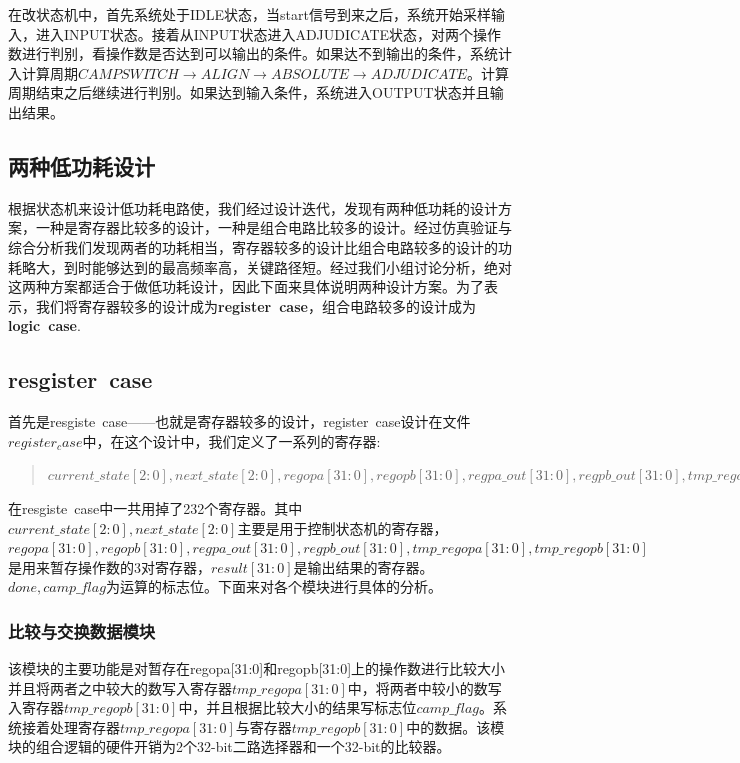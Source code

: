 \documentclass[12pt]{article}
\begin{document}
在改状态机中，首先系统处于IDLE状态，当start信号到来之后，系统开始采样输入，进入INPUT状态。接着从INPUT状态进入ADJUDICATE状态，对两个操作数进行判别，看操作数是否达到可以输出的条件。如果达不到输出的条件，系统计入计算周期$CAMPSWITCH \to ALIGN \to ABSOLUTE \to ADJUDICATE$。计算周期结束之后继续进行判别。如果达到输入条件，系统进入OUTPUT状态并且输出结果。

\subsection{两种低功耗设计}
根据状态机来设计低功耗电路使，我们经过设计迭代，发现有两种低功耗的设计方案，一种是寄存器比较多的设计，一种是组合电路比较多的设计。经过仿真验证与综合分析我们发现两者的功耗相当，寄存器较多的设计比组合电路较多的设计的功耗略大，到时能够达到的最高频率高，关键路径短。经过我们小组讨论分析，绝对这两种方案都适合于做低功耗设计，因此下面来具体说明两种设计方案。为了表示，我们将寄存器较多的设计成为\textbf{register~case}，组合电路较多的设计成为\textbf{logic~case}.

\subsection{resgister~case}
首先是resgiste~case——也就是寄存器较多的设计，register~case设计在文件$register_case$中，在这个设计中，我们定义了一系列的寄存器:

\begin{quote}
$current\_state[2:0],next\_state[2:0]
,regopa[31:0],regopb[31:0],
regpa\_out[31:0],
regpb\_out[31:0],tmp\_regopa[31:0],
tmp\_regopb[31:0],
result[31:0],
done,camp\_flag$
\end{quote}

在resgiste~case中一共用掉了232个寄存器。其中$current\_state[2:0],next\_state[2:0]$主要是用于控制状态机的寄存器，$regopa[31:0],regopb[31:0],regpa\_out[31:0],regpb\_out[31:0],tmp\_regopa[31:0],tmp\_regopb[31:0]$是用来暂存操作数的3对寄存器，$result[31:0]$是输出结果的寄存器。$done,camp\_flag$为运算的标志位。下面来对各个模块进行具体的分析。

\subsubsection{比较与交换数据模块}
该模块的主要功能是对暂存在regopa[31:0]和regopb[31:0]上的操作数进行比较大小并且将两者之中较大的数写入寄存器$tmp\_regopa[31:0]$中，将两者中较小的数写入寄存器$tmp\_regopb[31:0]$中，并且根据比较大小的结果写标志位$camp\_flag$。系统接着处理寄存器$tmp\_regopa[31:0]$与寄存器$tmp\_regopb[31:0]$中的数据。该模块的组合逻辑的硬件开销为2个32-bit二路选择器和一个32-bit的比较器。
\end{document}
